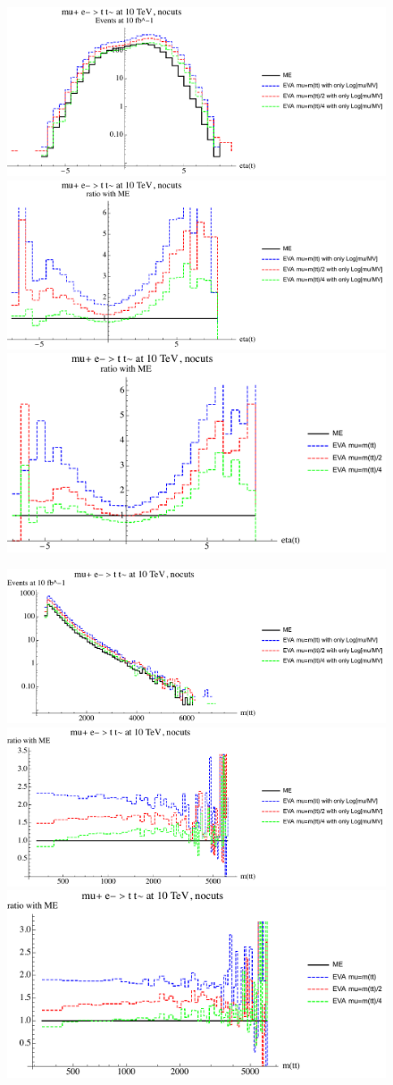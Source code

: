 \documentclass[a4paper,11pt]{article}
\begin{document}
\begin{figure}[ht]
\includegraphics[width=0.46\linewidth]{Notebooks/PlotDistr/WW_tt/10TeVnocuts/plotetat.pdf}
\includegraphics[width=0.46\linewidth]{Notebooks/PlotDistr/WW_tt/10TeVnocuts/plotetatratio1.pdf}
\includegraphics[width=0.46\linewidth]{Notebooks/PlotDistr/WW_tt/10TeVnocuts/plotetatratio2.pdf}
\end{figure}

\begin{figure}[ht]
\includegraphics[width=0.46\linewidth]{Notebooks/PlotDistr/WW_tt/10TeVnocuts/plotmtt.pdf}
\includegraphics[width=0.46\linewidth]{Notebooks/PlotDistr/WW_tt/10TeVnocuts/plotmttratio1.pdf}
\includegraphics[width=0.46\linewidth]{Notebooks/PlotDistr/WW_tt/10TeVnocuts/plotmttratio2.pdf}
\end{figure}
\end{document}
